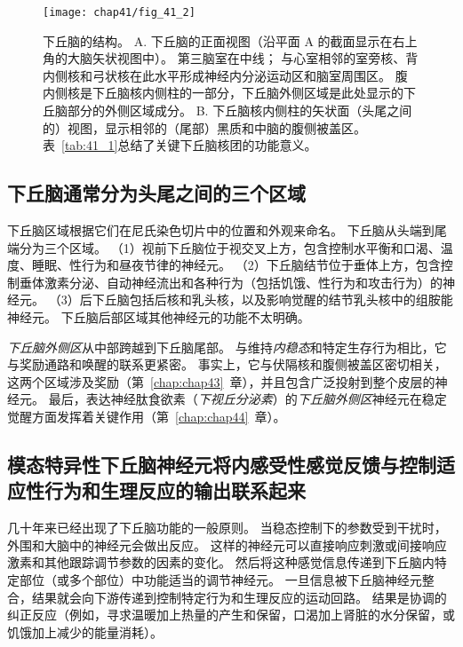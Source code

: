 \begin{figure}[htbp]
	\centering
	\texttt{[image: chap41/fig\_41\_2]}
	\caption{下丘脑的结构。
		A. 下丘脑的正面视图（沿平面 A 的截面显示在右上角的大脑矢状视图中）。
		第三脑室在中线；
		与心室相邻的室旁核、背内侧核和弓状核在此水平形成神经内分泌运动区和脑室周围区。
		腹内侧核是下丘脑核内侧柱的一部分，下丘脑外侧区域是此处显示的下丘脑部分的外侧区域成分。 
		B. 下丘脑核内侧柱的矢状面（头尾之间的）视图，显示相邻的（尾部）黑质和中脑的腹侧被盖区。
		表~\ref{tab:41_1}总结了关键下丘脑核团的功能意义。}
	\label{fig:41_2}
\end{figure}



\subsection{下丘脑通常分为头尾之间的三个区域}

下丘脑区域根据它们在尼氏染色切片中的位置和外观来命名。
下丘脑从头端到尾端分为三个区域。
（1）视前下丘脑位于视交叉上方，包含控制水平衡和口渴、温度、睡眠、性行为和昼夜节律的神经元。
（2）下丘脑结节位于垂体上方，包含控制垂体激素分泌、自动神经流出和各种行为（包括饥饿、性行为和攻击行为）的神经元。
（3）后下丘脑包括后核和乳头核，以及影响觉醒的结节乳头核中的组胺能神经元。
下丘脑后部区域其他神经元的功能不太明确。


\textit{下丘脑外侧区}从中部跨越到下丘脑尾部。
与维持\textit{内稳态}和特定生存行为相比，它与奖励通路和唤醒的联系更紧密。
事实上，它与伏隔核和腹侧被盖区密切相关，这两个区域涉及奖励（第~\ref{chap:chap43}~章），并且包含广泛投射到整个皮层的神经元。
最后，表达神经肽食欲素（\textit{下视丘分泌素}）的\textit{下丘脑外侧区}神经元在稳定觉醒方面发挥着关键作用（第~\ref{chap:chap44}~章）。



\subsection{模态特异性下丘脑神经元将内感受性感觉反馈与控制适应性行为和生理反应的输出联系起来}

几十年来已经出现了下丘脑功能的一般原则。
当稳态控制下的参数受到干扰时，外围和大脑中的神经元会做出反应。
这样的神经元可以直接响应刺激或间接响应激素和其他跟踪调节参数的因素的变化。
然后将这种感觉信息传递到下丘脑内特定部位（或多个部位）中功能适当的调节神经元。
一旦信息被下丘脑神经元整合，结果就会向下游传递到控制特定行为和生理反应的运动回路。
结果是协调的纠正反应（例如，寻求温暖加上热量的产生和保留，口渴加上肾脏的水分保留，或饥饿加上减少的能量消耗）。


